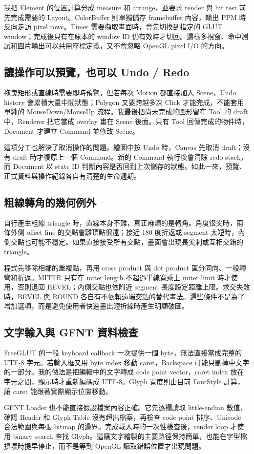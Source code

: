 我把 Element 的位置計算分成 measure 和 arrange，並要求 render 與 hit test 前先完成需要的 Layout。ColorBuffer 則單獨儲存 framebuffer 內容，輸出 PPM 時反向走訪 pixel rows。Timer 需要擷取畫面時，會先切換到指定的 GLUT window；完成後只有在原本的 window ID 仍有效時才切回。這樣多視窗、命中測試和圖片輸出可以共用座標定義，又不會忽略 OpenGL pixel I/O 的方向。

\subsection{讓操作可以預覽，也可以 Undo / Redo}

拖曳矩形或直線時需要即時預覽，但若每次 Motion 都直接加入 Scene，Undo history 會累積大量中間狀態；Polygon 又要跨越多次 Click 才能完成，不能套用單純的 MouseDown/MouseUp 流程。我最後把尚未完成的圖形留在 Tool 的 draft 中，Renderer 把它當成 overlay 畫在 Scene 後面。只有 Tool 回傳完成的物件時，Document 才建立 Command 並修改 Scene。

這項分工也解決了取消操作的問題。繪圖中按 Undo 時，Canvas 先取消 draft；沒有 draft 時才復原上一個 Command。新的 Command 執行後會清除 redo stack，而 Document 以 state ID 判斷內容是否回到上次儲存的狀態。如此一來，預覽、正式資料與操作紀錄各自有清楚的生命週期。

\subsection{粗線轉角的幾何例外}

自行產生粗線 triangle 時，直線本身不難，真正麻煩的是轉角。角度很尖時，兩條外側 offset line 的交點會離頂點很遠；接近 180 度折返或 segment 太短時，內側交點也可能不穩定。如果直接接受所有交點，畫面會出現長尖刺或互相交錯的 triangle。

程式先移除相鄰的重複點，再用 cross product 與 dot product 區分同向、一般轉彎和折返。MITER 只有在 miter length 不超過半線寬乘上 miter limit 時才使用，否則退回 BEVEL；內側交點也依附近 segment 長度設定距離上限。求交失敗時，BEVEL 與 ROUND 各自有不依賴遠端交點的替代畫法。這些條件不是為了增加選項，而是避免使用者快速畫出短折線時產生明顯破圖。

\subsection{文字輸入與 GFNT 資料檢查}

FreeGLUT 的一般 keyboard callback 一次提供一個 byte，無法直接當成完整的 UTF-8 字元。若輸入框又用 byte index 移動 caret，Backspace 可能只刪掉中文字的一部分。我的做法是把編輯中的文字轉成 code point vector，caret index 放在字元之間，顯示時才重新編碼成 UTF-8。Glyph 寬度則由目前 FontStyle 計算，讓 caret 能跟著實際顯示位置移動。

GFNT Loader 也不能直接假設檔案內容正確。它先逐欄讀取 little-endian 數值，確認 Header 和 Glyph Table 沒有超出檔案，再檢查 code point 排序、Unicode 合法範圍與每張 bitmap 的邊界。完成載入時的一次性檢查後，render loop 才使用 binary search 查找 Glyph。這讓文字繪製的主要路徑保持簡單，也能在字型檔損壞時提早停止，而不是等到 OpenGL 讀取錯誤位置才出現問題。
